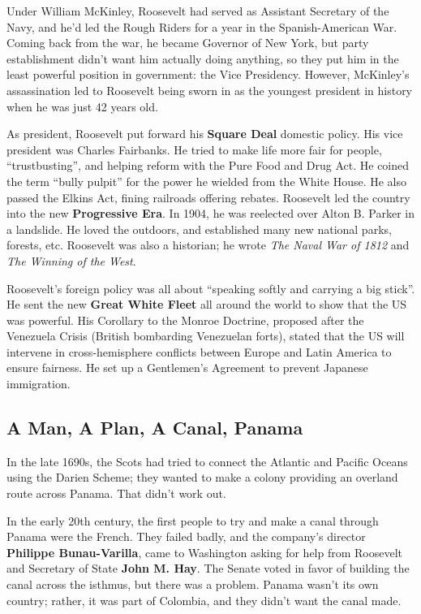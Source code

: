 Under William McKinley, Roosevelt had served as Assistant Secretary of the Navy,
and he'd led the Rough Riders for a year in the Spanish-American War.
Coming back from the war, he became Governor of New York,
but party establishment didn't want him actually doing anything,
so they put him in the least powerful position in government: the Vice Presidency.
However, McKinley's assassination led to Roosevelt being sworn in as the youngest president in history
when he was just 42 years old.

As president, Roosevelt put forward his \textbf{Square Deal} domestic policy.
His vice president was Charles Fairbanks.
He tried to make life more fair for people, ``trustbusting'',
and helping reform with the Pure Food and Drug Act.
He coined the term ``bully pulpit'' for the power he wielded from the White House.
He also passed the Elkins Act, fining railroads offering rebates.
Roosevelt led the country into the new \textbf{Progressive Era}.
In 1904, he was reelected over Alton B. Parker in a landslide.
He loved the outdoors, and established many new national parks, forests, etc.
Roosevelt was also a historian; he wrote \textit{The Naval War of 1812} and \textit{The Winning of the West}.

Roosevelt's foreign policy was all about ``speaking softly and carrying a big stick''.
He sent the new \textbf{Great White Fleet} all around the world to show that the US was powerful.
His Corollary to the Monroe Doctrine, proposed after the Venezuela Crisis (British bombarding Venezuelan forts),
stated that the US will intervene in cross-hemisphere conflicts between Europe and Latin America to ensure fairness.
He set up a Gentlemen's Agreement to prevent Japanese immigration.

\subsection*{A Man, A Plan, A Canal, Panama}

In the late 1690s, the Scots had tried to connect the Atlantic and Pacific Oceans using the Darien Scheme;
they wanted to make a colony providing an overland route across Panama.
That didn't work out.

In the early 20th century, the first people to try and make a canal through Panama were the French.
They failed badly, and the company's director \textbf{Philippe Bunau-Varilla},
came to Washington asking for help from Roosevelt and Secretary of State \textbf{John M. Hay}.
The Senate voted in favor of building the canal across the isthmus, but there was a problem.
Panama wasn't its own country; rather, it was part of Colombia, and they didn't want the canal made.

